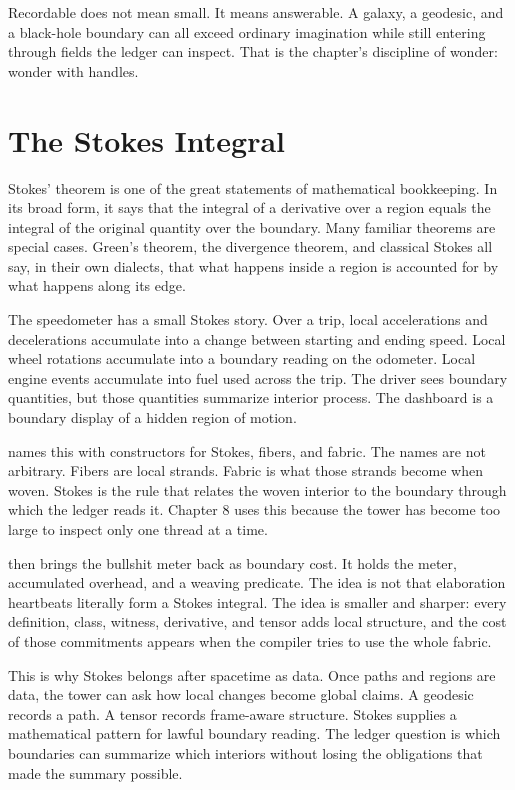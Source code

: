 Recordable does not mean small. It means answerable. A galaxy, a geodesic, and
a black-hole boundary can all exceed ordinary imagination while still entering
through fields the ledger can inspect. That is the chapter's discipline of
wonder: wonder with handles.

\section{The Stokes Integral}
\label{se:stokes-integral}

Stokes' theorem is one of the great statements of mathematical bookkeeping. In
its broad form, it says that the integral of a derivative over a region equals
the integral of the original quantity over the boundary. Many familiar theorems
are special cases. Green's theorem, the divergence theorem, and classical
Stokes all say, in their own dialects, that what happens inside a region is
accounted for by what happens along its edge.

The speedometer has a small Stokes story. Over a trip, local accelerations and
decelerations accumulate into a change between starting and ending speed.
Local wheel rotations accumulate into a boundary reading on the odometer.
Local engine events accumulate into fuel used across the trip. The driver sees
boundary quantities, but those quantities summarize interior process. The
dashboard is a boundary display of a hidden region of motion.

 names this with constructors for Stokes, fibers, and fabric.
The names are not arbitrary. Fibers are local strands. Fabric is what those
strands become when woven. Stokes is the rule that relates the woven interior
to the boundary through which the ledger reads it. Chapter 8 uses this because
the tower has become too large to inspect only one thread at a time.

 then brings the bullshit meter back as boundary cost.
It holds the meter, accumulated overhead, and a weaving predicate. The idea is
not that elaboration heartbeats literally form a Stokes integral. The idea is
smaller and sharper: every definition, class, witness, derivative, and tensor
adds local structure, and the cost of those commitments appears when the
compiler tries to use the whole fabric.

This is why Stokes belongs after spacetime as data. Once paths and regions are
data, the tower can ask how local changes become global claims. A geodesic
records a path. A tensor records frame-aware structure. Stokes supplies a
mathematical pattern for lawful boundary reading. The ledger question is which
boundaries can summarize which interiors without losing the obligations that
made the summary possible.

